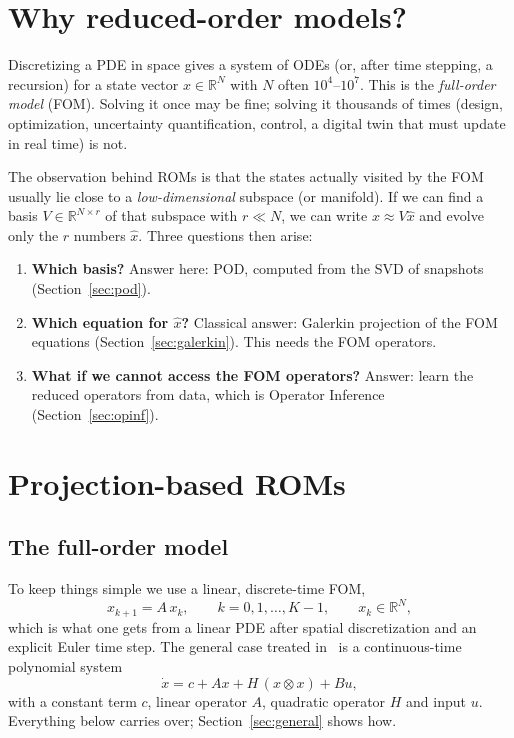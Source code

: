 \documentclass[11pt]{article}
\theoremstyle{remark}\newtheorem{remark}{Remark}
\newcommand{\R}{\mathbb{R}}
\newcommand{\xh}{\hat{x}}
\begin{document}
\section{Why reduced-order models?}\label{sec:why}
Discretizing a PDE in space gives a system of ODEs (or, after time stepping, a recursion) for a state vector $x\in\R^N$ with $N$ often $10^4$--$10^7$. This is the \emph{full-order model} (FOM). Solving it once may be fine; solving it thousands of times (design, optimization, uncertainty quantification, control, a digital twin that must update in real time) is not.

The observation behind ROMs is that the states actually visited by the FOM usually lie close to a \emph{low-dimensional} subspace (or manifold). If we can find a basis $V\in\R^{N\times r}$ of that subspace with $r\ll N$, we can write $x\approx V\xh$ and evolve only the $r$ numbers $\xh$. Three questions then arise:
\begin{enumerate}[leftmargin=1.5em]
\item \textbf{Which basis?} Answer here: POD, computed from the SVD of snapshots (Section~\ref{sec:pod}).
\item \textbf{Which equation for $\xh$?} Classical answer: Galerkin projection of the FOM equations (Section~\ref{sec:galerkin}). This needs the FOM operators.
\item \textbf{What if we cannot access the FOM operators?} Answer: learn the reduced operators from data, which is Operator Inference (Section~\ref{sec:opinf}).
\end{enumerate}

\section{Projection-based ROMs}\label{sec:rom}
\subsection{The full-order model}
To keep things simple we use a linear, discrete-time FOM,
\begin{equation}\label{eq:fom}
x_{k+1}=A\,x_k,\qquad k=0,1,\dots,K-1,\qquad x_k\in\R^N,
\end{equation}
which is what one gets from a linear PDE after spatial discretization and an explicit Euler time step. The general case treated in~\cite{PW16,KPW24} is a continuous-time polynomial system
\begin{equation}\label{eq:poly}
\dot x = c + A x + H\,(x\otimes x) + B u ,
\end{equation}
with a constant term $c$, linear operator $A$, quadratic operator $H$ and input $u$. Everything below carries over; Section~\ref{sec:general} shows how.
\end{document}
